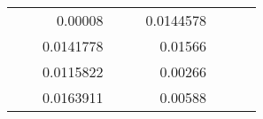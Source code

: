 \begin{table}[H]
\begin{tabular}{|ccrccrccc}
\multicolumn{1}{|c|}{\cellcolor[HTML]{FFFFC7}}                                & \multicolumn{1}{c|}{\cellcolor[HTML]{DDFDFF}}                      & \multicolumn{1}{r|}{\cellcolor[HTML]{DAE8FC}0.00008}     & \multicolumn{1}{c|}{\cellcolor[HTML]{FFFFC7}}                                & \multicolumn{1}{c|}{\cellcolor[HTML]{DDFDFF}}                       & \multicolumn{1}{r|}{\cellcolor[HTML]{DDFDFF}0.0144578}   &                                                                              &                                                                    &                                                          \\ \cline{3-3} \cline{6-6}
\multicolumn{1}{|c|}{\cellcolor[HTML]{FFFFC7}}                                & \multicolumn{1}{c|}{\cellcolor[HTML]{DDFDFF}}                      & \multicolumn{1}{r|}{\cellcolor[HTML]{DDFDFF}0.0141778}   & \multicolumn{1}{c|}{\cellcolor[HTML]{FFFFC7}}                                & \multicolumn{1}{c|}{\cellcolor[HTML]{DDFDFF}}                       & \multicolumn{1}{r|}{\cellcolor[HTML]{DAE8FC}0.01566}     &                                                                              &                                                                    &                                                          \\ \cline{3-3} \cline{6-6}
\multicolumn{1}{|c|}{\cellcolor[HTML]{FFFFC7}}                                & \multicolumn{1}{c|}{\cellcolor[HTML]{DDFDFF}}                      & \multicolumn{1}{r|}{\cellcolor[HTML]{DAE8FC}0.0115822}   & \multicolumn{1}{c|}{\cellcolor[HTML]{FFFFC7}}                                & \multicolumn{1}{c|}{\cellcolor[HTML]{DDFDFF}}                       & \multicolumn{1}{r|}{\cellcolor[HTML]{DDFDFF}0.00266}     &                                                                              &                                                                    &                                                          \\ \cline{3-3} \cline{6-6}
\multicolumn{1}{|c|}{\cellcolor[HTML]{FFFFC7}}                                & \multicolumn{1}{c|}{\cellcolor[HTML]{DDFDFF}}                      & \multicolumn{1}{r|}{\cellcolor[HTML]{DDFDFF}0.0163911}   & \multicolumn{1}{c|}{\cellcolor[HTML]{FFFFC7}}                                & \multicolumn{1}{c|}{\cellcolor[HTML]{DDFDFF}}                       & \multicolumn{1}{r|}{\cellcolor[HTML]{DAE8FC}0.00588}     &                                                                              &                                                                    &                                                          \\ \cline{3-3} \cline{6-6}

\end{tabular}
\end{table}
